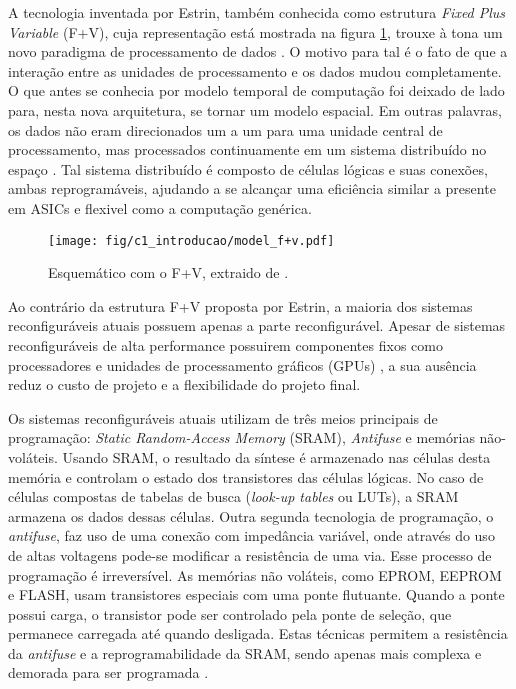 \documentclass[11pt,a4paper,oneside]{book}
\begin{document}
A tecnologia inventada por Estrin, tamb\'em conhecida como estrutura \textit{Fixed Plus Variable} (F+V), cuja representação está mostrada na figura \ref{fig:model_f+v}, trouxe \`a tona um novo paradigma de processamento de dados \cite{Hartenstein2001}.
O motivo para tal \'e o fato de que a intera\c{c}\~ao entre as unidades de processamento e os dados mudou completamente.
O que antes se conhecia por modelo temporal de computa\c{c}\~ao foi deixado de lado para, nesta nova arquitetura, se tornar um modelo espacial.
Em outras palavras, os dados n\~ao eram direcionados um a um para uma unidade central de processamento, mas processados continuamente em um sistema distribu\'i­do no espa\c{c}o \cite{vassiliadis2007fine}.
Tal sistema distribu\'i­do \'e composto de c\'elulas l\'ogicas e suas conex\~oes, ambas reprogram\'aveis, ajudando a se alcan\c{c}ar uma efici\^encia similar a presente em ASICs e flexivel como a computa\c{c}\~ao gen\'erica.

\begin{figure}[h]
\centering
\texttt{[image: fig/c1\_introducao/model\_f+v.pdf]}
\caption{Esquem\'atico com o F+V, extraido de \cite{Estrin2002}.}
\label{fig:model_f+v}
\end{figure}

Ao contr\'ario da estrutura F+V proposta por Estrin, a maioria dos sistemas reconfigur\'aveis atuais possuem apenas a parte reconfigur\'avel.
Apesar de sistemas reconfigur\'aveis de alta performance possuirem componentes fixos como processadores e unidades de processamento gr\'aficos (GPUs) \cite{El-Ghazawi2008}, a sua aus\^encia reduz o custo de projeto e a flexibilidade do projeto final.

Os sistemas reconfigur\'aveis atuais utilizam de tr\^es meios principais de programa\c{c}\~ao: \textit{Static Random-Access Memory} (SRAM), \textit{Antifuse} e mem\'orias n\~ao-vol\'ateis.
Usando SRAM, o resultado da s\'i­ntese
 \'e armazenado nas c\'elulas desta mem\'oria e controlam o estado dos transistores das c\'elulas l\'ogicas.
No caso de c\'elulas compostas de tabelas de busca (\textit{look-up tables} ou LUTs), a SRAM armazena os dados dessas c\'elulas.
Outra segunda tecnologia de programa\c{c}\~ao, o \textit{antifuse}, faz uso de uma conex\~ao com imped\^ancia vari\'avel, onde atrav\'es do uso de altas voltagens pode-se modificar a resist\^encia de uma via.
Esse processo de programa\c{c}\~ao \'e irrevers\'i­vel.
As mem\'orias n\~ao vol\'ateis, como EPROM, EEPROM e FLASH, usam transistores especiais com uma ponte flutuante.
Quando a ponte possui carga, o transistor pode ser controlado pela ponte de sele\c{c}\~ao, que permanece carregada at\'e quando desligada.
Estas t\'ecnicas permitem a resist\^encia da \textit{antifuse} e a reprogramabilidade da SRAM, sendo apenas mais complexa e demorada para ser programada \cite{vassiliadis2007fine}.
\end{document}
